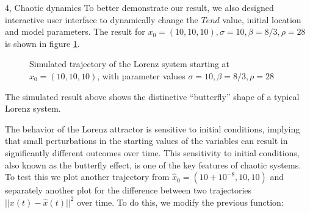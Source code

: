 \documentclass[10pt,a4paper]{article}
\begin{document}
\begin{task}{4, Chaotic dynamics}
To better demonstrate our result, we also designed interactive user interface to dynamically change the $Tend$ value, initial location and model parameters. The result for $x_0=(10, 10, 10), \sigma=10, \beta=8/3, \rho=28$ is shown in figure \ref{fig:task4-2-1}.

\begin{figure} [H]
    \centering
    \caption{Simulated trajectory of the Lorenz system starting at $x_0=(10, 10, 10)$, with parameter values $\sigma=10, \beta=8/3, \rho=28$}
    \label{fig:task4-2-1}
\end{figure}

The simulated result above shows the distinctive ``butterfly'' shape of a typical Lorenz system.

The behavior of the Lorenz attractor is sensitive to initial conditions, implying that small perturbations in the starting values of the variables can result in significantly different outcomes over time. This sensitivity to initial conditions, also known as the butterfly effect, is one of the key features of chaotic systems. To test this we plot another trajectory from $\hat{x}_0=(10+10^{-8}, 10, 10)$ and separately another plot for the difference between two trajectories $||x(t)-\hat{x}(t)||^2$ over time. To do this, we modify the previous function:


\end{task}
\end{document}
